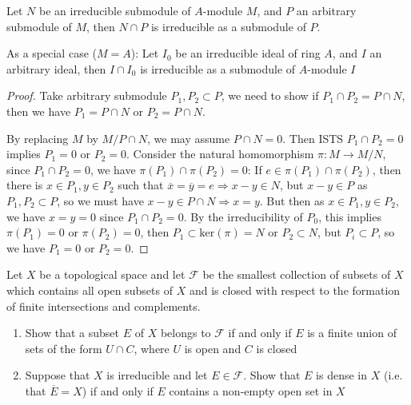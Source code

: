 \documentclass{solution}
\begin{document}
\begin{proposition}
    Let $N$ be an irreducible submodule of $A$-module $M$, and $P$ an arbitrary submodule of $M$, then $N \cap P$ is irreducible as a submodule of $P$.

    As a special case ($M = A$): Let $I_0$ be an irreducible ideal of ring $A$, and $I$ an arbitrary ideal, then $I \cap I_0$ is irreducible as a submodule of $A$-module $I$
\end{proposition}

\begin{proof}
    Take arbitrary submodule $P_1, P_2 \subset P$, we need to show if $P_1 \cap P_2 = P \cap N$, then we have $P_1 = P \cap N$ or $P_2 = P \cap N$.

    By replacing $M$ by $M / P \cap N$, we may assume $P \cap N = 0$. Then ISTS $P_1 \cap P_2 = 0$ implies $P_1 = 0$ or $P_2 = 0$. Consider the natural homomorphism $\pi: M \rightarrow M / N$, since $P_1 \cap P_2 = 0$, we have $\pi(P_1) \cap \pi(P_2) = 0$: If $e \in \pi(P_1) \cap \pi(P_2)$, then there is $x \in P_1, y \in P_2$ such that $\overline{x} = \overline{y} = e \Rightarrow x - y \in N$, but $x - y \in P$ as $P_1, P_2 \subset P$, so we must have $x - y \in P \cap N \Rightarrow x = y$. But then as $x \in P_1, y \in P_2$, we have $x = y = 0$ since $P_1 \cap P_2 = 0$. By the irreducibility of $P_0$, this implies $\pi(P_1) = 0$ or $\pi(P_2) = 0$, then $P_1 \subset \mathrm{ker}(\pi) = N$ or $P_2 \subset N$, but $P_i \subset P$, so we have $P_1 = 0$ or $P_2 = 0$.
\end{proof}

\begin{problem}
    Let $X$ be a topological space and let $\mathcal{F}$ be the smallest collection of subsets of $X$ which contains all open subsets of $X$ and is closed with respect to the formation of finite intersections and complements.

    \begin{enumerate}
        \item Show that a subset $E$ of $X$ belongs to $\mathcal{F}$ if and only if $E$ is a finite union of sets of the form $U \cap C$, where $U$ is open and $C$ is closed
        \item Suppose that $X$ is irreducible and let $E \in \mathcal{F}$. Show that $E$ is dense in $X$ (i.e. that $\overline{E} = X$) if and only if $E$ contains a non-empty open set in $X$
    \end{enumerate}
\end{problem}
\end{document}
